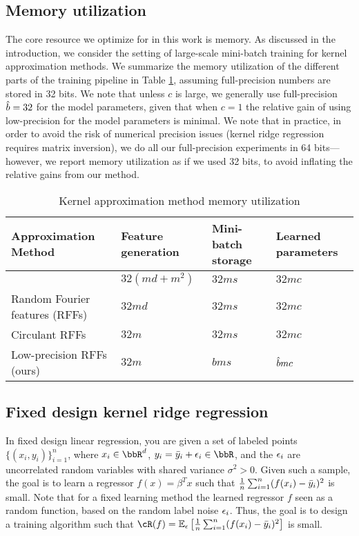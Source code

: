 \subsection{Memory utilization}
The core resource we optimize for in this work is memory.  As discussed in the introduction, we consider the setting of large-scale mini-batch training for kernel approximation methods.  We summarize the memory utilization of the different parts of the training pipeline in Table \ref{table:mem-usage}, assuming full-precision numbers are stored in 32 bits. We note that unless $c$ is large, we generally use full-precision $\hat{b} = 32$ for the model parameters, given that when $c=1$ the relative gain of using low-precision for the model parameters is minimal.  We note that in practice, in order to avoid the risk of numerical precision issues (kernel ridge regression requires matrix inversion), we do all our full-precision experiments in 64 bits---however, we report memory utilization as if we used 32 bits, to avoid inflating the relative gains from our method.

\begin{table}
	\caption{Kernel approximation method memory utilization}
	\label{table:mem-usage}
	\centering
	\begin{tabular}{llll}
		\toprule
		Approximation Method & Feature generation & Mini-batch storage & Learned parameters \\
		\midrule
		\Nystrom \citep{nystrom} & $32(md + m^2)$ & $32ms$ & $32mc$ \\
		Random Fourier features (RFFs) \citep{rahimi07random} &  $32md$ & $32ms$ & $32mc$ \\
		Circulant RFFs \citep{yu15} & $32m$ & $32ms$ & $32mc$ \\
		Low-precision RFFs (ours)& $32m$ & $bms$ & $\hat{b} mc$ \\
		\bottomrule
	\end{tabular}
\end{table}

\subsection{Fixed design kernel ridge regression}
In fixed design linear regression, you are given a set of labeled points $\{(x_i,y_i)\}_{i=1}^n$, where $x_i \in \RR^d$, $y_i = \by_i + \eps_i \in \RR$, and the $\epsilon_i$ are uncorrelated random variables with shared variance $\sigma^2 > 0$.  Given such a sample, the goal is to learn a regressor $f(x) = \beta^T x$ such that $\frac{1}{n}\sum_{i=1}^n (f(x_i) - \bar{y}_i)^2$ is small. Note that for a fixed learning method the learned regressor $f$ seen as a random function, based on the random label noise $\epsilon_i$.  Thus, the goal is to design a training algorithm such that $\cR(f) = \expect{\eps}{\frac{1}{n}\sum_{i=1}^n (f(x_i) - \by_i)^2}$ is small.

